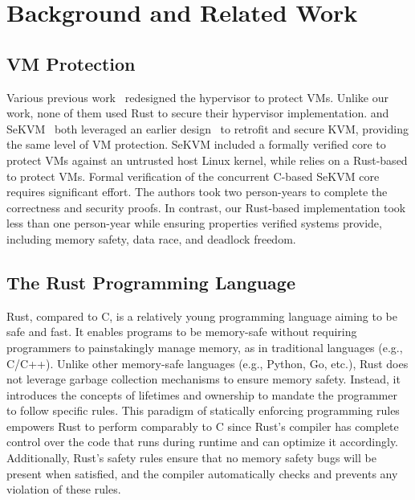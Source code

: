 
\chapter{Background and Related Work}
\label{sec:bgrw}

\section{VM Protection}
Various previous work~\cite{lisosp21,zhang2011cloudvisor,zeyu20usenix,pkvm,fidelius-hpca18,sekvm}
redesigned the hypervisor to protect VMs. Unlike our work, none of them used
Rust to secure their hypervisor implementation.
\rustsec{} and SeKVM~\cite{sekvm} both leveraged an earlier design~\cite{hypsec}
to retrofit and secure KVM, providing the same level of VM protection. SeKVM
included a formally verified core to protect VMs against an untrusted host Linux
kernel, while \rustsec{} relies on a Rust-based \rustcore{} to protect VMs.
Formal verification of the concurrent C-based SeKVM core requires significant effort.
The authors took two person-years to complete the correctness and security proofs.
In contrast, our Rust-based implementation took less than one person-year while
ensuring properties verified systems provide, including memory safety,
data race, and deadlock freedom.

\section{The Rust Programming Language}
Rust, compared to C,
is a relatively young programming language aiming to be safe and fast.
It enables programs to be memory-safe without requiring programmers to
painstakingly manage memory, as in traditional languages (e.g., C/C++).
Unlike other memory-safe languages (e.g., Python, Go, etc.),
Rust does not leverage garbage collection mechanisms
to ensure memory safety.
Instead, it introduces the concepts of lifetimes and ownership
to mandate the programmer to follow specific rules.
This paradigm of statically enforcing programming rules
empowers Rust to perform comparably to C since Rust's compiler has complete
control over the code that
runs during runtime and can optimize it accordingly.
Additionally, Rust's safety rules ensure that
no memory safety bugs will be present when satisfied,
and the compiler automatically checks and prevents any violation of these rules.

